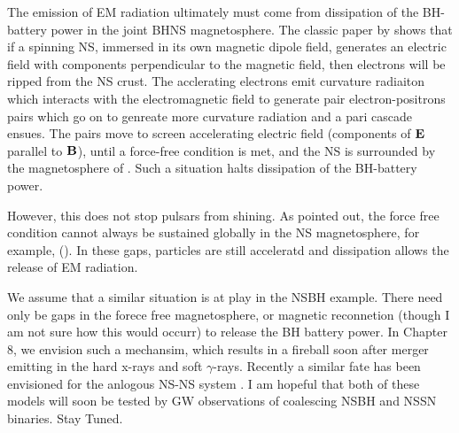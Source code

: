 The emission of EM radiation ultimately must come from dissipation of the BH-
battery power in the joint BHNS magnetosphere. The classic paper by
\cite{GJ69} shows that if a spinning NS, immersed in its own magnetic dipole
field, generates an electric field with components perpendicular to the
magnetic field, then electrons will be ripped from the NS crust. The
acclerating electrons emit curvature radiaiton which interacts with the
electromagnetic field to generate pair electron-positrons pairs which go on to
genreate more curvature radiation and a pari cascade ensues. The pairs move to
screen accelerating electric field (components of ${\bf E}$ parallel to
${\bf B}$), until a force-free condition is met, and the NS is surrounded by the
magnetosphere of \citep{GJ69}. Such a situation halts dissipation of the BH-battery power. 

However, this does not stop pulsars from shining.  As \citep{RS72} pointed out, the force free condition cannot always be sustained globally in the NS magnetosphere, for example, (). In these gaps, particles are still acceleratd and dissipation allows the release of EM radiation.

We assume that a similar situation is at play in the NSBH example. There need only be gaps in the forece free magnetosphere, or magnetic reconnetion (though I am not sure how this would occurr) to release the BH battery power. In Chapter 8, we envision such a mechansim, which results in a fireball soon after merger emitting in the hard x-rays and soft $\gamma$-rays. Recently a similar fate has been envisioned for the anlogous NS-NS system \citep{MetzgerNSNS:2016}. I am hopeful that both of these models will soon be tested by GW observations of coalescing NSBH and NSSN binaries. Stay Tuned.













